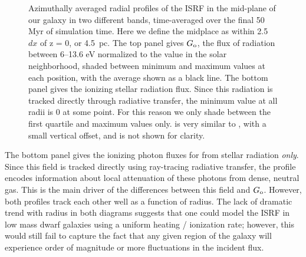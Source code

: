 \documentclass[twocolumn]{aastex61}
\begin{document}
\begin{figure}
\caption{
Azimuthally averaged radial profiles of the ISRF in the mid-plane of our galaxy in two different bands, time-averaged over the final 50 Myr of simulation time. Here we define the midplace as within 2.5~$dx$ of z = 0, or 4.5~pc. The top panel gives $G_{\rm o}$, the flux of radiation between 6--13.6 eV normalized to the value in the solar neighborhood, shaded between minimum and maximum values at each position, with the average shown as a black line. The bottom panel gives the  ionizing stellar radiation flux. Since this radiation is tracked directly through radiative transfer, the minimum value at all radii is 0 at some point. For this reason we only shade between the first quartile and maximum values only.  is very similar to , with a small vertical offset, and is not shown for clarity.}
\label{fig:ISRF}
\end{figure}

The bottom panel gives the ionizing photon fluxes for  from stellar radiation {\em only}. Since this field is tracked directly using ray-tracing radiative transfer, the profile encodes information about local attenuation of these photons from dense, neutral gas. This is the main driver of the differences between this field and $G_{\rm o}$. However, both profiles track each other well as a function of radius. The lack of dramatic trend with radius in both diagrams suggests that one could model the ISRF in low mass dwarf galaxies using a uniform heating / ionization rate; however, this would still fail to capture the fact that any given region of the galaxy will experience order of magnitude or more fluctuations in the incident flux. 
\end{document}
